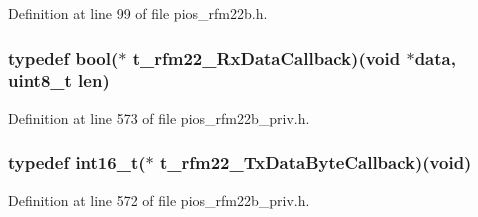 \-Definition at line 99 of file pios\-\_\-rfm22b.\-h.

\hypertarget{group___p_i_o_s___r_f_m22_b_ga6d517bc1c96f4b523eb7a289850c3bb8}{
\subsubsection[{t\-\_\-rfm22\-\_\-\-Rx\-Data\-Callback}]{\setlength{\rightskip}{0pt plus 5cm}typedef bool($\ast$ {\bf t\-\_\-rfm22\-\_\-\-Rx\-Data\-Callback})(void $\ast$data, uint8\-\_\-t len)}}\label{group___p_i_o_s___r_f_m22_b_ga6d517bc1c96f4b523eb7a289850c3bb8}


\-Definition at line 573 of file pios\-\_\-rfm22b\-\_\-priv.\-h.

\hypertarget{group___p_i_o_s___r_f_m22_b_ga10adbdf30d2b2a9c6eab132094364df2}{
\subsubsection[{t\-\_\-rfm22\-\_\-\-Tx\-Data\-Byte\-Callback}]{\setlength{\rightskip}{0pt plus 5cm}typedef int16\-\_\-t($\ast$ {\bf t\-\_\-rfm22\-\_\-\-Tx\-Data\-Byte\-Callback})(void)}}\label{group___p_i_o_s___r_f_m22_b_ga10adbdf30d2b2a9c6eab132094364df2}


\-Definition at line 572 of file pios\-\_\-rfm22b\-\_\-priv.\-h.



